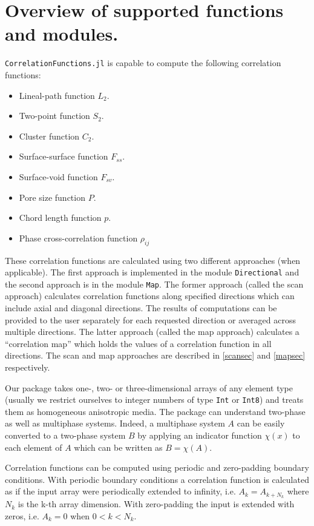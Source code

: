 \documentclass[reprint,amsmath,amssymb,aps,pre,nofootinbib]{revtex4-1}
\newcommand{\code}[1]{\colorbox{light-gray}{\texttt{#1}}}
\begin{document}
\section{Overview of supported functions and modules.}
\label{oversec}
\verb+CorrelationFunctions.jl+ is capable to compute the following correlation
functions:
\begin{itemize}
\item Lineal-path function $L_2$.
\item Two-point function $S_2$.
\item Cluster function $C_2$.
\item Surface-surface function $F_{ss}$.
\item Surface-void function $F_{sv}$.
\item Pore size function $P$.
\item Chord length function $p$.
\item Phase cross-correlation function $\rho_{ij}$
\end{itemize}

These correlation functions are calculated using two different approaches (when
applicable). The first approach is implemented in the module \code{Directional}
and the second approach is in the module \code{Map}. The former approach (called
the scan approach) calculates correlation functions along specified directions
which can include axial and diagonal directions. The results of computations can
be provided to the user separately for each requested direction or averaged
across multiple directions. The latter approach (called the map approach)
calculates a ``correlation map'' which holds the values of a correlation
function in all directions. The scan and map approaches are described in
\cref{scansec} and \cref{mapsec} respectively.

Our package takes one-, two- or three-dimensional arrays of any element type
(usually we restrict ourselves to integer numbers of type \code{Int} or
\code{Int8}) and treats them as homogeneous anisotropic media. The package can
understand two-phase as well as multiphase systems. Indeed, a multiphase system
$A$ can be easily converted to a two-phase system $B$ by applying an indicator
function $\chi(x)$ to each element of $A$ which can be written as $B = \chi(A)$.

Correlation functions can be computed using periodic and zero-padding boundary
conditions. With periodic boundary conditions a correlation function is
calculated as if the input array were periodically extended to infinity,
i.e. $A_k = A_{k+N_k}$ where $N_k$ is the k-th array dimension. With
zero-padding the input is extended with zeros, i.e. $A_k = 0$ when
$0 < k < N_k$.
\end{document}
